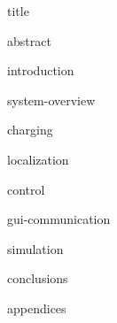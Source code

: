 \documentclass[11pt,titlepage]{report}
\begin{document}
{title}

\clearpage
{abstract}
\tableofcontents
				
\clearpage
{}
{introduction}

{system-overview}

{charging}

{localization}

{control}

{gui-communication}

{simulation}

{conclusions}

\clearpage
{}
\printbibliography[heading=bibintoc]

\clearpage
{appendices}
\end{document}
